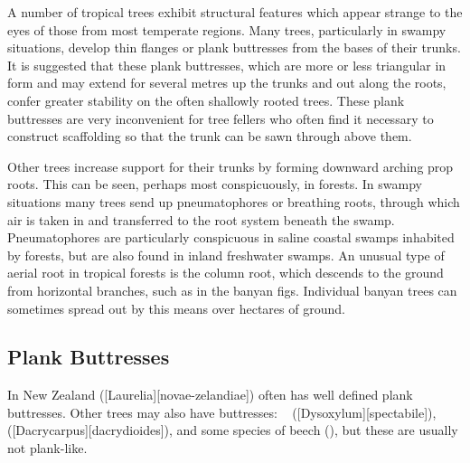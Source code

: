 A number of tropical trees exhibit structural features which appear strange to the eyes of those from most temperate regions.
Many trees, particularly in swampy situations, develop thin flanges or plank buttresses from the bases of their trunks.
It is suggested that these plank buttresses, which are more or less triangular in form and may extend for several metres up the trunks and out along the roots, confer greater stability on the often shallowly rooted trees.
These plank buttresses are very inconvenient for tree fellers who often find it necessary to construct scaffolding so that the trunk can be sawn through above them.

Other trees increase support for their trunks by forming downward arching prop roots.
This can be seen, perhaps most conspicuously, in  forests.
In swampy situations many trees send up pneumatophores or breathing roots, through which air is taken in and transferred to the root system beneath the swamp.
Pneumatophores are particularly conspicuous in saline coastal swamps inhabited by  forests, but are also found in inland freshwater swamps.
An unusual type of aerial root in tropical forests is the column root, which descends to the ground from horizontal branches, such as in the banyan figs.
Individual banyan trees can sometimes spread out by this means over hectares of ground.

\subsection{Plank Buttresses}

In New Zealand  ([Laurelia][novae-zelandiae]) often has well defined plank buttresses.
Other trees may also have buttresses: \eg\  ([Dysoxylum][spectabile]),  ([Dacrycarpus][dacrydioides]), and some species of beech (), but these are usually not plank-like.

